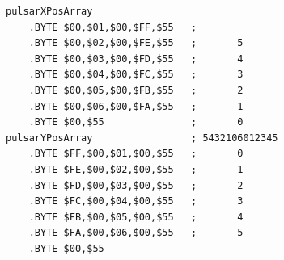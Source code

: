 \begin{minipage}[b]{0.48\linewidth}
\begin{lrbox}{\mybox}%
\begin{lstlisting}[basicstyle=\ttfamily\tiny]
pulsarXPosArray
    .BYTE $00,$01,$00,$FF,$55   ;
    .BYTE $00,$02,$00,$FE,$55   ;       5      
    .BYTE $00,$03,$00,$FD,$55   ;       4      
    .BYTE $00,$04,$00,$FC,$55   ;       3      
    .BYTE $00,$05,$00,$FB,$55   ;       2      
    .BYTE $00,$06,$00,$FA,$55   ;       1      
    .BYTE $00,$55               ;       0      
pulsarYPosArray                 ; 5432106012345
    .BYTE $FF,$00,$01,$00,$55   ;       0      
    .BYTE $FE,$00,$02,$00,$55   ;       1      
    .BYTE $FD,$00,$03,$00,$55   ;       2      
    .BYTE $FC,$00,$04,$00,$55   ;       3      
    .BYTE $FB,$00,$05,$00,$55   ;       4      
    .BYTE $FA,$00,$06,$00,$55   ;       5      
    .BYTE $00,$55                   
\end{lstlisting}
\end{lrbox}%
\scalebox{0.8}{\usebox{\mybox}}

\end{minipage}
